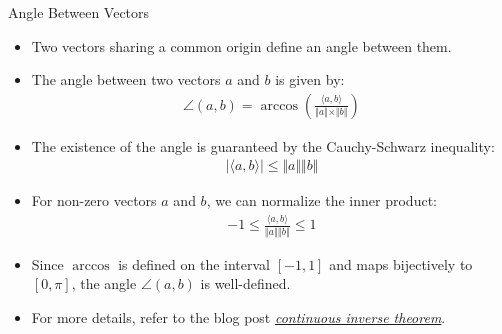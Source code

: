 \begin{frame}{Angle Between Vectors}
\begin{itemize}
    \item Two vectors sharing a common origin define an angle between them.
    \begin{center}
\end{center}
    \item The angle between two vectors $a$ and $b$ is given by:
    \begin{align}
        \angle(a, b) = \arccos \left(\frac{\langle a, b \rangle}{\Vert a \Vert \times \Vert b \Vert} \right) \label{eq2,22}
    \end{align}
\end{itemize}
\end{frame}
\begin{frame}
    \begin{itemize}
        \item The existence of the angle is guaranteed by the Cauchy-Schwarz inequality:
        \begin{align}
            |\langle a, b \rangle| \leq \Vert a \Vert \Vert b \Vert
        \end{align}
        \item For non-zero vectors $a$ and $b$, we can normalize the inner product:
        \begin{align*}
            -1 \leq \frac{\langle a, b \rangle }{\Vert a \Vert \Vert b \Vert} \leq 1
        \end{align*}
        \item Since $\arccos$ is defined on the interval $[-1, 1]$ and maps bijectively to $[0, \pi]$, the angle $\angle(a, b)$ is well-defined.
        \item For more details, refer to the blog post  \textit{\href{https://www.jmabiala.com/blog/continuous_inverse_theorem}{continuous inverse theorem}}.
    \end{itemize}
\end{frame}


